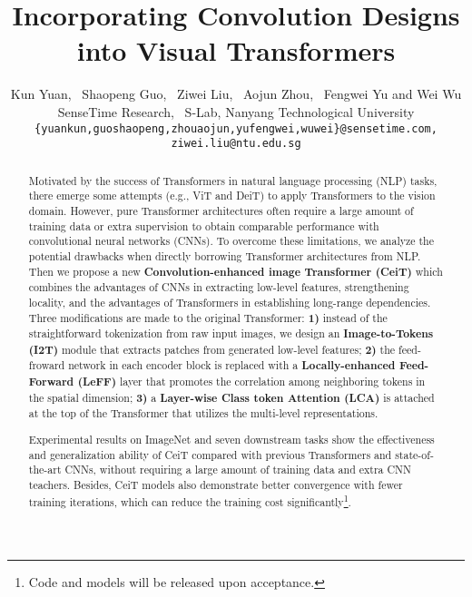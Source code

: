 \documentclass[10pt,twocolumn,letterpaper]{article}
\begin{document}
\title{Incorporating Convolution Designs into Visual Transformers}


\author{Kun Yuan, \ Shaopeng Guo, \ Ziwei Liu, \ Aojun Zhou, \ Fengwei Yu and Wei Wu \\
SenseTime Research, \ S-Lab, Nanyang Technological University\\
{\tt\small \{yuankun,guoshaopeng,zhouaojun,yufengwei,wuwei\}@sensetime.com, ziwei.liu@ntu.edu.sg}
}

\maketitle
\ificcvfinal\thispagestyle{empty}\fi

\begin{abstract}

Motivated by the success of Transformers in natural language processing (NLP) tasks, there emerge some attempts (e.g., ViT and DeiT) to apply Transformers to the vision domain. However, pure Transformer architectures often require a large amount of training data or extra supervision to obtain comparable performance with convolutional neural networks (CNNs). To overcome these limitations, we analyze the potential drawbacks when directly borrowing Transformer architectures from NLP. Then we propose a new \textbf{Convolution-enhanced image Transformer (CeiT)} which combines the advantages of CNNs in extracting low-level features, strengthening locality, and the advantages of Transformers in establishing long-range dependencies. Three modifications are made to the original Transformer: \textbf{1)} instead of the straightforward tokenization from raw input images, we design an \textbf{Image-to-Tokens (I2T)} module that extracts patches from generated low-level features; \textbf{2)} the feed-froward network in each encoder block is replaced with a \textbf{Locally-enhanced Feed-Forward (LeFF)} layer that promotes the correlation among neighboring tokens in the spatial dimension; \textbf{3)} a \textbf{Layer-wise Class token Attention (LCA)} is attached at the top of the Transformer that utilizes the multi-level representations.

Experimental results on ImageNet and seven downstream tasks show the effectiveness and generalization ability of CeiT compared with previous Transformers and state-of-the-art CNNs, without requiring a large amount of training data and extra CNN teachers. Besides, CeiT models also demonstrate better convergence with  fewer training iterations, which can reduce the training cost significantly\footnote{Code and models will be released upon acceptance.}.

\end{abstract}
\end{document}
